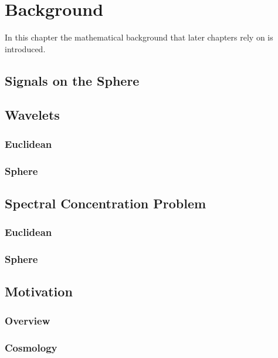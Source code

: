 \chapter{Background}\label{sec:chapter2}

In this chapter the mathematical background that later chapters rely on is introduced.

\section{Signals on the Sphere}

\section{Wavelets}

\subsection{Euclidean}

\subsection{Sphere}

\section{Spectral Concentration Problem}

\subsection{Euclidean}

\subsection{Sphere}

\section{Motivation}

\subsection{Overview}

\subsection{Cosmology}

